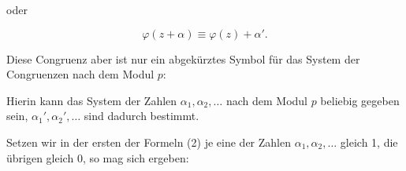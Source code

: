 oder

\[
\varphi(z+\alpha) \equiv \varphi(z) + \alpha'.
\]

Diese Congruenz aber ist nur ein abgekürztes Symbol für das System der Congruenzen nach dem Modul $p$:


Hierin kann das System der Zahlen $\alpha_1, \alpha_2, \dots$ nach dem Modul $p$ beliebig gegeben sein, $\alpha_1', \alpha_2', \dots$ sind dadurch bestimmt.

Setzen wir in der ersten der Formeln (2) je eine der Zahlen $\alpha_1, \alpha_2, \dots$ gleich 1, die übrigen gleich 0, so mag sich ergeben:

